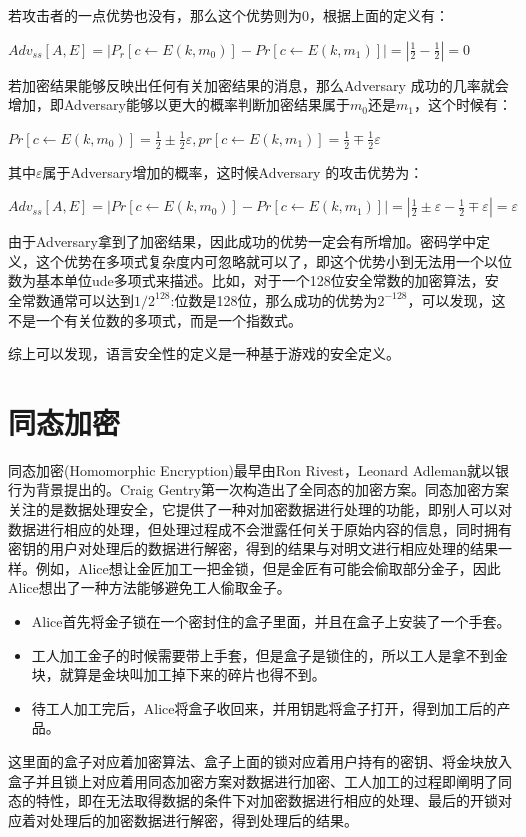 若攻击者的一点优势也没有，那么这个优势则为0，根据上面的定义有：
\begin{center}
    $Adv_{ss}[A,E]=|P_r[c \leftarrow E(k,m_0)]-Pr[c \leftarrow E(k,m_1)]|=|\frac{1}{2}-\frac{1}{2}|=0$
\end{center}
若加密结果能够反映出任何有关加密结果的消息，那么Adversary 成功的几率就会增加，即Adversary能够以更大的概率判断加密结果属于$m_0$还是$m_1$，这个时候有：
\begin{center}
$Pr[c \leftarrow E(k,m_0)]=\frac{1}{2}\pm\frac{1}{2}\varepsilon,pr[c\leftarrow E(k,m_1)]=\frac{1}{2}\mp\frac{1}{2}\varepsilon$
\end{center}
其中$\varepsilon$属于Adversary增加的概率，这时候Adversary 的攻击优势为：
\begin{center}
$Adv_{ss}[A,E]=|Pr[c\leftarrow E(k,m_0)]-Pr[c \leftarrow E(k,m_1)]|=|\frac{1}{2}\pm \varepsilon - \frac{1}{2}\mp \varepsilon|=\varepsilon$
\end{center}
由于Adversary拿到了加密结果，因此成功的优势一定会有所增加。密码学中定义，这个优势在多项式复杂度内可忽略就可以了，即这个优势小到无法用一个以位数为基本单位ude多项式来描述。比如，对于一个128位安全常数的加密算法，安全常数通常可以达到$1/2^{128}$:位数是128位，那么成功的优势为$2^{-128}$，可以发现，这不是一个有关位数的多项式，而是一个指数式。

综上可以发现，语言安全性的定义是一种基于游戏的安全定义。
\section{同态加密}
同态加密(Homomorphic Encryption)最早由Ron Rivest，Leonard Adleman就以银行为背景提出的。Craig Gentry第一次构造出了全同态的加密方案。同态加密方案关注的是数据处理安全，它提供了一种对加密数据进行处理的功能，即别人可以对数据进行相应的处理，但处理过程成不会泄露任何关于原始内容的信息，同时拥有密钥的用户对处理后的数据进行解密，得到的结果与对明文进行相应处理的结果一样。例如，Alice想让金匠加工一把金锁，但是金匠有可能会偷取部分金子，因此Alice想出了一种方法能够避免工人偷取金子。
\begin{itemize}
\item Alice首先将金子锁在一个密封住的盒子里面，并且在盒子上安装了一个手套。
\item 工人加工金子的时候需要带上手套，但是盒子是锁住的，所以工人是拿不到金块，就算是金块叫加工掉下来的碎片也得不到。
\item 待工人加工完后，Alice将盒子收回来，并用钥匙将盒子打开，得到加工后的产品。
\end{itemize}
这里面的盒子对应着加密算法、盒子上面的锁对应着用户持有的密钥、将金块放入盒子并且锁上对应着用同态加密方案对数据进行加密、工人加工的过程即阐明了同态的特性，即在无法取得数据的条件下对加密数据进行相应的处理、最后的开锁对应着对处理后的加密数据进行解密，得到处理后的结果。

